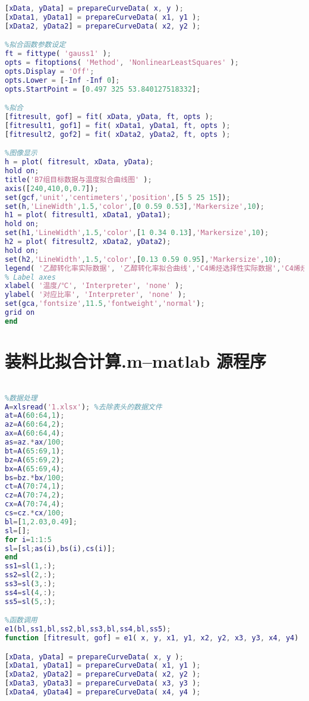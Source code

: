 \documentclass[withoutpreface,bwprint]{cumcmthesis} %
\begin{document}
\begin{appendices}
\begin{lstlisting}[language=matlab]
[xData, yData] = prepareCurveData( x, y );
[xData1, yData1] = prepareCurveData( x1, y1 );
[xData2, yData2] = prepareCurveData( x2, y2 );

%拟合函数参数设定
ft = fittype( 'gauss1' );
opts = fitoptions( 'Method', 'NonlinearLeastSquares' );
opts.Display = 'Off';
opts.Lower = [-Inf -Inf 0];
opts.StartPoint = [0.497 325 53.840127518332];

%拟合
[fitresult, gof] = fit( xData, yData, ft, opts );
[fitresult1, gof1] = fit( xData1, yData1, ft, opts );
[fitresult2, gof2] = fit( xData2, yData2, ft, opts );

%图像显示
h = plot( fitresult, xData, yData);
hold on;
title('B7组目标数据与温度拟合曲线图' );
axis([240,410,0,0.7]);
set(gcf,'unit','centimeters','position',[5 5 25 15]);
set(h,'LineWidth',1.5,'color',[0 0.59 0.53],'Markersize',10);
h1 = plot( fitresult1, xData1, yData1);
hold on;
set(h1,'LineWidth',1.5,'color',[1 0.34 0.13],'Markersize',10);
h2 = plot( fitresult2, xData2, yData2);
hold on;
set(h2,'LineWidth',1.5,'color',[0.13 0.59 0.95],'Markersize',10);
legend( '乙醇转化率实际数据', '乙醇转化率拟合曲线','C4烯烃选择性实际数据','C4烯烃选择性拟合曲线','C4烯烃收率实际数据','C4烯烃收率拟合曲线', 'Location', 'NorthWest', 'Interpreter', 'none' );
% Label axes
xlabel( '温度/℃', 'Interpreter', 'none' );
ylabel( '对应比率', 'Interpreter', 'none' );
set(gca,'fontsize',11.5,'fontweight','normal');
grid on
end	
\end{lstlisting}	

\section{装料比拟合计算.m--matlab 源程序}
\begin{lstlisting}[language=matlab]
%装料比拟合

%数据处理
A=xlsread('1.xlsx'); %去除表头的数据文件
at=A(60:64,1);
az=A(60:64,2);
ax=A(60:64,4);
as=az.*ax/100;
bt=A(65:69,1);
bz=A(65:69,2);
bx=A(65:69,4);
bs=bz.*bx/100;
ct=A(70:74,1);
cz=A(70:74,2);
cx=A(70:74,4);
cs=cz.*cx/100;
bl=[1,2.03,0.49];
sl=[];
for i=1:1:5
sl=[sl;as(i),bs(i),cs(i)];  
end
ss1=sl(1,:);
ss2=sl(2,:);
ss3=sl(3,:);
ss4=sl(4,:);
ss5=sl(5,:);

%函数调用
e1(bl,ss1,bl,ss2,bl,ss3,bl,ss4,bl,ss5);
function [fitresult, gof] = e1( x, y, x1, y1, x2, y2, x3, y3, x4, y4) 

[xData, yData] = prepareCurveData( x, y );
[xData1, yData1] = prepareCurveData( x1, y1 );
[xData2, yData2] = prepareCurveData( x2, y2 );
[xData3, yData3] = prepareCurveData( x3, y3 );
[xData4, yData4] = prepareCurveData( x4, y4 );


\end{lstlisting}
\end{appendices}
\end{document}
